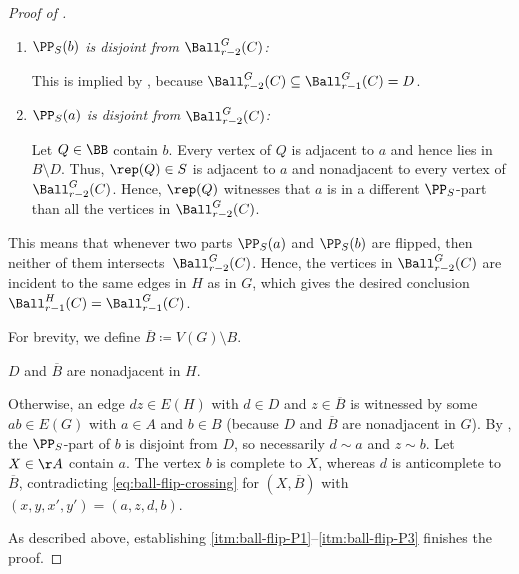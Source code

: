 \begin{proof}[Proof of ]
\begin{claimproof}
    \begin{enumerate}
    \item \emph{$\PP_S(b)$ is disjoint from $\Ball_{r-2}^G(C)$:}

    This is implied by , because $\Ball_{r-2}^G(C) \subseteq \Ball_{r-1}^G(C) =D$.

    \item \emph{$\PP_S(a)$ is disjoint from $\Ball_{r-2}^G(C)$:}

    Let $Q\in\BB$ contain $b$.
    Every vertex of $Q$ is adjacent to $a$ and hence lies in $B\setminus D$.
    Thus, $\rep(Q)\in S$ is adjacent to $a$ and nonadjacent to every vertex of $\Ball_{r-2}^G(C)$.
    Hence, $\rep(Q)$ witnesses that $a$ is in a different $\PP_S$-part than all the vertices in $\Ball_{r-2}^G(C)$.
    \end{enumerate}

    This means that whenever two parts $\PP_S(a)$ and $\PP_S(b)$ are flipped, then neither of them intersects~$\Ball_{r-2}^G(C)$.
    Hence, the vertices in $\Ball_{r-2}^G(C)$ are incident to the same edges in $H$ as in $G$, which gives the desired conclusion
    $\Ball_{r-1}^H(C) = \Ball_{r-1}^G(C)$.
    \end{claimproof}

    For brevity, we define $\overline B\coloneqq V(G)\setminus B$.

    \begin{claim}[\ref{itm:ball-flip-P3}]\label{clm:ball-flip-P3}
        $D$ and $\overline B$ are nonadjacent in $H$.
    \end{claim}

    \begin{claimproof}
            Otherwise, an edge $dz\in E(H)$ with $d \in D$ and $z \in \overline B$ is witnessed by some $ab\in E(G)$ with $a \in A$ and $b \in B$ (because $D$ and $\overline B$ are nonadjacent in $G$).
    By , the $\PP_S$-part of $b$ is disjoint from $D$, so necessarily $d\sim a$ and $z\sim b$.
    Let $X\in\AA$ contain $a$.
    The vertex $b$ is complete to $X$, whereas $d$ is anticomplete to $\overline B$, contradicting \eqref{eq:ball-flip-crossing} for $(X,\overline B)$ with $(x,y,x',y')=(a,z,d,b)$.
    \end{claimproof}
    As described above, establishing \ref{itm:ball-flip-P1}--\ref{itm:ball-flip-P3} finishes the proof.
\end{proof}
